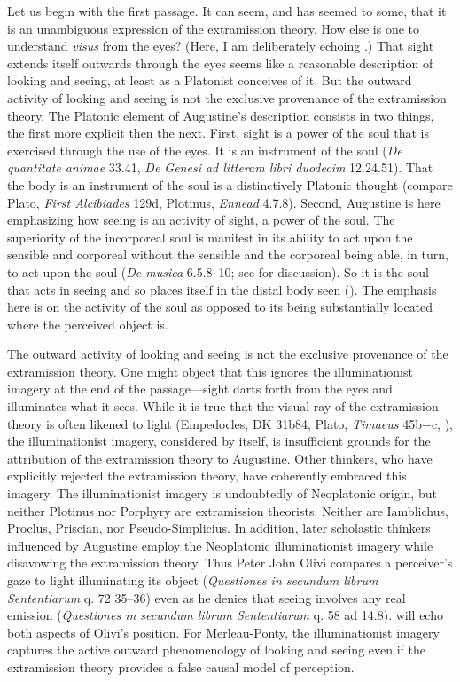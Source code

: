 \documentclass[12pt]{article}
\begin{document}
Let us begin with the first passage. It can seem, and has seemed to some, that it is an unambiguous expression of the extramission theory. How else is one to understand \emph{visus} from the eyes? (Here, I am deliberately echoing \citealt[13--14]{Turnbull:1978ya}.) That sight extends itself outwards through the eyes seems like a reasonable description of looking and seeing, at least as a Platonist conceives of it. But the outward activity of looking and seeing is not the exclusive provenance of the extramission theory. The Platonic element of Augustine's description consists in two things, the first more explicit then the next. First, sight is a power of the soul that is exercised through the use of the eyes. It is an instrument of the soul (\emph{De quantitate animae} 33.41, \emph{De Genesi ad litteram libri duodecim} 12.24.51). That the body is an instrument of the soul is a distinctively Platonic thought (compare Plato, \emph{First Alcibiades} 129d, Plotinus, \emph{Ennead} 4.7.8). Second, Augustine is here emphasizing how seeing is an activity of sight, a power of the soul. The superiority of the incorporeal soul is manifest in its ability to act upon the sensible and corporeal without the sensible and the corporeal being able, in turn, to act upon the soul (\emph{De musica} 6.5.8--10; see \citealt{Silva:2014bh} for discussion). So it is the soul that acts in seeing and so places itself in the distal body seen (\citealt[205, n.55]{Colleran:1949ys}). The emphasis here is on the activity of the soul as opposed to its being substantially located where the perceived object is.

The outward activity of looking and seeing is not the exclusive provenance of the extramission theory. One might object that this ignores the illuminationist imagery at the end of the passage---sight darts forth from the eyes and illuminates what it sees. While it is true that the visual ray of the extramission theory is often likened to light (Empedocles, \textsc{DK} 31b84, Plato, \emph{Timaeus} 45b−c, \citealt{Burnet:1905oq}), the illuminationist imagery, considered by itself, is insufficient grounds for the attribution of the extramission theory to Augustine. Other thinkers, who have explicitly rejected the extramission theory, have coherently embraced this imagery. The illuminationist imagery is undoubtedly of Neoplatonic origin, but neither Plotinus nor Porphyry are extramission theorists. Neither are Iamblichus, Proclus, Priscian, nor Pseudo-Simplicius. In addition, later scholastic thinkers influenced by Augustine employ the Neoplatonic illuminationist imagery while disavowing the extramission theory. Thus Peter John Olivi compares a perceiver's gaze to light illuminating its object (\emph{Questiones in secundum librum Sententiarum} q. 72 35–36) even as he denies that seeing involves any real emission (\emph{Questiones in secundum librum Sententiarum} q. 58 ad 14.8). 
\citet[185]{Merleau-Ponty:1967fj} will echo both aspects of Olivi's position. For Merleau-Ponty, the illuminationist imagery captures the active outward phenomenology of looking and seeing even if the extramission theory provides a false causal model of perception.
\end{document}
